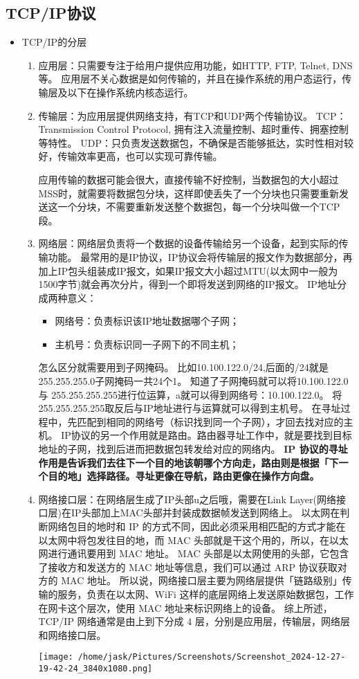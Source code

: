\documentclass[11pt]{article}
\begin{document}
\subsection{TCP/IP协议}
\label{sec:org6438e2e}
\begin{itemize}
\item TCP/IP的分层
\begin{enumerate}
\item 应用层：只需要专注于给用户提供应用功能，如HTTP, FTP, Telnet, DNS等。
应用层不关心数据是如何传输的，并且在操作系统的用户态运行，传输层及以下在操作系统内核态运行。
\item 传输层：为应用层提供网络支持，有TCP和UDP两个传输协议。
TCP：Transmission Control Protocol, 拥有注入流量控制、超时重传、拥塞控制等特性。
UDP：只负责发送数据包，不确保是否能够抵达，实时性相对较好，传输效率更高，也可以实现可靠传输。

应用传输的数据可能会很大，直接传输不好控制，当数据包的大小超过MSS时，就需要将数据包分块，这样即使丢失了一个分块也只需要重新发送这一个分块，不需要重新发送整个数据包，每一个分块叫做一个TCP段。
\item 网络层：网络层负责将一个数据的设备传输给另一个设备，起到实际的传输功能。
最常用的是IP协议，IP协议会将传输层的报文作为数据部分，再加上IP包头组装成IP报文，如果IP报文大小超过MTU(以太网中一般为1500字节)就会再次分片，得到一个即将发送到网络的IP报文。
IP地址分成两种意义：
\begin{itemize}
\item 网络号：负责标识该IP地址数据哪个子网；
\item 主机号：负责标识同一子网下的不同主机；
\end{itemize}
怎么区分就需要用到子网掩码。
比如10.100.122.0/24,后面的/24就是255.255.255.0子网掩码一共24个1。
知道了子网掩码就可以将10.100.122.0 与 255.255.255.255进行位运算，a就可以得到网络号：10.100.122.0。
将255.255.255.255取反后与IP地址进行与运算就可以得到主机号。
在寻址过程中，先匹配到相同的网络号（标识找到同一个子网），才回去找对应的主机。
IP协议的另一个作用就是路由。路由器寻址工作中，就是要找到目标地址的子网，找到后进而把数据包转发给对应的网络内。
\textbf{IP 协议的寻址作用是告诉我们去往下一个目的地该朝哪个方向走，路由则是根据「下一个目的地」选择路径。寻址更像在导航，路由更像在操作方向盘。}
\item 网络接口层：在网络层生成了IP头部u之后哦，需要在Link Layer(网络接口层)在IP头部加上MAC头部并封装成数据帧发送到网络上。
以太网在判断网络包目的地时和 IP 的方式不同，因此必须采用相匹配的方式才能在以太网中将包发往目的地，而 MAC 头部就是干这个用的，所以，在以太网进行通讯要用到 MAC 地址。
MAC 头部是以太网使用的头部，它包含了接收方和发送方的 MAC 地址等信息，我们可以通过 ARP 协议获取对方的 MAC 地址。
所以说，网络接口层主要为网络层提供「链路级别」传输的服务，负责在以太网、WiFi 这样的底层网络上发送原始数据包，工作在网卡这个层次，使用 MAC 地址来标识网络上的设备。
综上所述，TCP/IP 网络通常是由上到下分成 4 层，分别是应用层，传输层，网络层和网络接口层。
\begin{center}
\texttt{[image: /home/jask/Pictures/Screenshots/Screenshot\_2024-12-27-19-42-24\_3840x1080.png]}
\end{center}
\end{enumerate}
\end{itemize}
\end{document}
